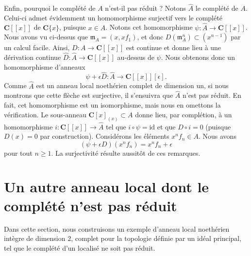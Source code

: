 \medskip\noindent
Enfin, pourquoi le complété de $A$ n'est-il pas réduit ? Notons $\hat A$ le
complété de $A$. Celui-ci admet évidemment un homomorphisme surjectif vers le complété
$\mathbf{C}[[x]]$ de $\mathbf{C}\{x\}$, puisque $x \in A$. Notons
cet homomorphisme $\psi : \hat A \to \mathbf{C}[[x]]$.
Nous avons vu ci-dessus que $\mathfrak m_A = (x, xf_1)$,
et donc $D(\mathfrak m_A^n) \subset (x^{n - 1})$ par un calcul
facile. Ainsi, $D : A \to \mathbf{C}[[x]]$ est continue et
donne lieu à une dérivation continue $\hat D : \hat A \to \mathbf{C}[[x]]$
au-dessus de $\psi$. Nous obtenons donc un homomorphisme d'anneaux
$$
\psi + \epsilon \hat D :
\hat A
\longrightarrow
\mathbf{C}[[x]][\epsilon].
$$
Comme $\hat A$ est un anneau local noethérien complet de dimension un, si nous
montrons que cette flèche est surjective, il s'ensuivra que $\hat A$
n'est pas réduit. En fait, cet homomorphisme est un isomorphisme, mais nous en omettons
la vérification. Le sous-anneau $\mathbf{C}[x]_{(x)} \subset A$
donne lieu, par complétion, à un homomorphisme $i : \mathbf{C}[[x]] \to \hat A$ tel
que $i \circ \psi = \text{id}$ et que $D \circ i = 0$
(puisque $D(x) = 0$ par construction). Considérons les éléments $x^nf_n \in A$.
Nous avons
$$
(\psi + \epsilon D)(x^nf_n) = x^n f_n + \epsilon
$$
pour tout $n \geq 1$. La surjectivité résulte aussitôt de ces remarques.





\section{Un autre anneau local dont le complété n'est pas réduit}
\label{section-another-local-completion-nonreduced}

\noindent
Dans cette section, nous construisons un exemple d'anneau local noethérien intègre
de dimension $2$, complet pour la topologie définie par un idéal principal,
tel que le complété d'un localisé ne soit pas réduit.


